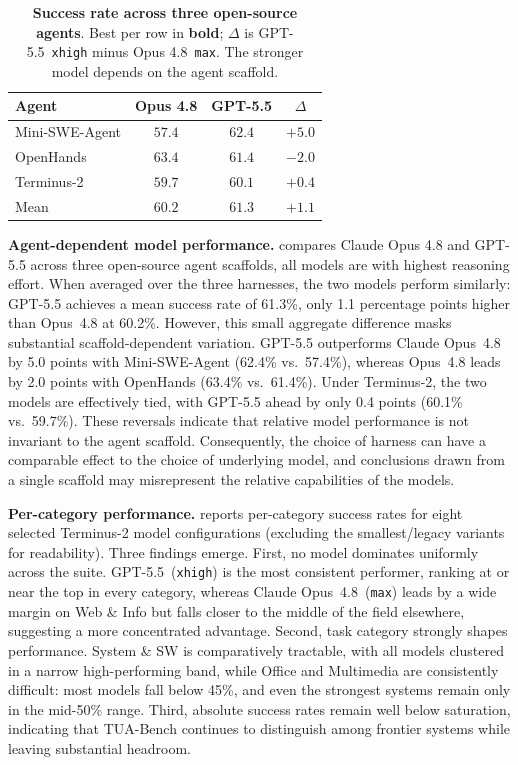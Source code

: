 \begin{table}
  \centering
  \small
  \vspace{-\baselineskip}
  \caption{\textbf{Success rate across three open-source agents}. Best per row in \textbf{bold}; $\Delta$ is GPT-5.5~\texttt{xhigh} minus Opus 4.8~\texttt{max}. The stronger model depends on the agent scaffold.}
  \label{tab:model-comparison}
  \begin{tabular}{l c c c}
    \toprule
    Agent & Opus 4.8 & GPT-5.5 & $\Delta$ \\
    \midrule
    Mini-SWE-Agent & $57.4$          & $\mathbf{62.4}$ & $+5.0$ \\
    OpenHands  & $\mathbf{63.4}$ & $61.4$          & $-2.0$ \\
    Terminus-2     & $59.7$          & $\mathbf{60.1}$ & $+0.4$ \\
    \midrule
    Mean           & $60.2$          & $\mathbf{61.3}$ & $+1.1$ \\
    \bottomrule
  \end{tabular}
\end{table}

\noindent\textbf{Agent-dependent model performance.}
 compares Claude Opus 4.8 and GPT-5.5 across three open-source agent scaffolds, all models are with highest reasoning effort. When averaged over the three harnesses, the two models perform similarly: GPT-5.5 achieves a mean success rate of 61.3\%, only 1.1 percentage points higher than Opus~4.8 at 60.2\%. However, this small aggregate difference masks substantial scaffold-dependent variation. GPT-5.5 outperforms Claude Opus~4.8 by 5.0 points with Mini-SWE-Agent (62.4\% vs.\ 57.4\%), whereas Opus~4.8 leads by 2.0 points with OpenHands (63.4\% vs.\ 61.4\%). Under Terminus-2, the two models are effectively tied, with GPT-5.5 ahead by only 0.4 points (60.1\% vs.\ 59.7\%). These reversals indicate that relative model performance is not invariant to the agent scaffold. Consequently, the choice of harness can have a comparable effect to the choice of underlying model, and conclusions drawn from a single scaffold may misrepresent the relative capabilities of the models.


\noindent\textbf{Per-category performance.}  reports per-category success rates for eight selected Terminus-2 model configurations (excluding the smallest/legacy variants for readability). Three findings emerge. First, no model dominates uniformly across the suite. GPT-5.5~(\texttt{xhigh}) is the most consistent performer, ranking at or near the top in every category, whereas Claude Opus~4.8~(\texttt{max}) leads by a wide margin on Web \& Info but falls closer to the middle of the field elsewhere, suggesting a more concentrated advantage. Second, task category strongly shapes performance. System \& SW is comparatively tractable, with all models clustered in a narrow high-performing band, while Office and Multimedia are consistently difficult: most models fall below 45\%, and even the strongest systems remain only in the mid-50\% range. Third, absolute success rates remain well below saturation, indicating that TUA-Bench continues to distinguish among frontier systems while leaving substantial headroom. 

